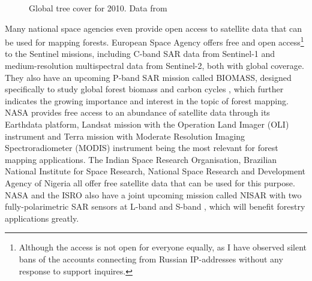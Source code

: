 \begin{figure}
\caption[Global tree cover map]{\label{fig-forest-coverage}Global tree cover for 2010. Data from \citet{hansenHighResolutionGlobalMaps2013}
}
\end{figure}

Many national space agencies even provide open access to satellite data that can be used for mapping forests.
European Space Agency offers free and open access\footnote{Although the access is not open for everyone equally, as I have observed silent bans of the accounts connecting from Russian IP-addresses without any response to support inquires.} to the Sentinel missions, including C-band SAR data from Sentinel-1 and medium-resolution multispectral data from Sentinel-2, both with global coverage.
They also have an upcoming P-band SAR mission called BIOMASS, designed specifically to study global forest biomass and carbon cycles \citep{queganEuropeanSpaceAgency2019}, which further indicates the growing importance and interest in the topic of forest mapping.
NASA provides free access to an abundance of satellite data through its Earthdata platform, Landsat mission with the Operation Land Imager (OLI) instrument and Terra mission with Moderate Resolution Imaging Spectroradiometer (MODIS) instrument being the most relevant for forest mapping applications.
The Indian Space Research Organisation, Brazilian National Institute for Space Research, National Space Research and Development Agency of Nigeria all offer free satellite data that can be used for this purpose.
NASA and the ISRO also have a joint upcoming mission called NISAR with two fully-polarimetric SAR sensors at L-band and S-band \citep{kelloggNASAISROSyntheticAperture2020}, which will benefit forestry applications greatly.

